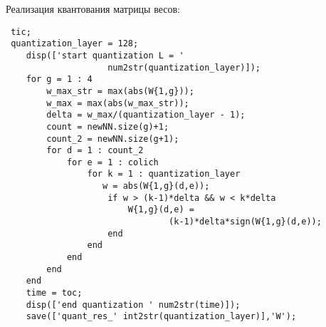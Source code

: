 Реализация квантования матрицы весов:
\begin{verbatim}
 tic;
 quantization_layer = 128; 
    disp(['start quantization L = '
                    num2str(quantization_layer)]);
    for g = 1 : 4
        w_max_str = max(abs(W{1,g}));
        w_max = max(abs(w_max_str));
        delta = w_max/(quantization_layer - 1);
        count = newNN.size(g)+1;
        count_2 = newNN.size(g+1);
        for d = 1 : count_2
            for e = 1 : colich
                for k = 1 : quantization_layer
                   w = abs(W{1,g}(d,e));
                    if w > (k-1)*delta && w < k*delta
                        W{1,g}(d,e) = 
                                (k-1)*delta*sign(W{1,g}(d,e));
                    end
                end
            end
        end
    end
    time = toc;
    disp(['end quantization ' num2str(time)]);
    save(['quant_res_' int2str(quantization_layer)],'W');
\end{verbatim}